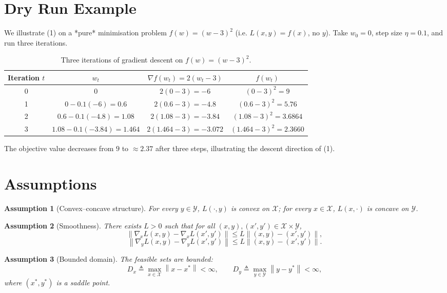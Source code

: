 \documentclass{article}
\newcommand{\norm}[1]{\left\|#1\right\|}
\newtheorem{assumption}{Assumption}
\begin{document}
\section*{Dry Run Example}
We illustrate (1) on a *pure* minimisation problem $f(w)=(w-3)^2$ (i.e. $L(x,y)=f(x)$, no $y$).  
Take $w_0=0$, step size $\eta=0.1$, and run three iterations.

\begin{table}[h]
\centering
\begin{tabular}{c c c c}
\toprule
Iteration $t$ & $w_t$ & $\nabla f(w_t)=2(w_t-3)$ & $f(w_t)$\\
\midrule
0 & $0$ & $2(0-3)=-6$ & $(0-3)^2=9$\\
1 & $0-0.1(-6)=0.6$ & $2(0.6-3)=-4.8$ & $(0.6-3)^2=5.76$\\
2 & $0.6-0.1(-4.8)=1.08$ & $2(1.08-3)=-3.84$ & $(1.08-3)^2=3.6864$\\
3 & $1.08-0.1(-3.84)=1.464$ & $2(1.464-3)=-3.072$ & $(1.464-3)^2=2.3660$\\
\bottomrule
\end{tabular}
\caption{Three iterations of gradient descent on $f(w)=(w-3)^2$.}
\end{table}

The objective value decreases from $9$ to $\approx2.37$ after three steps, illustrating the descent direction of (1).

\newpage
\section*{Assumptions}
\begin{assumption}[Convex–concave structure]\label{ass:convconc}
For every $y\in\mathcal{Y}$, $L(\cdot ,y)$ is convex on $\mathcal{X}$;  
for every $x\in\mathcal{X}$, $L(x,\cdot )$ is concave on $\mathcal{Y}$.
\end{assumption}

\begin{assumption}[Smoothness]\label{ass:smooth}
There exists $L>0$ such that for all $(x,y),(x',y')\in\mathcal{X}\times\mathcal{Y}$,
\[
\norm{\nabla_x L(x,y)-\nabla_x L(x',y')}\le L\norm{(x,y)-(x',y')},
\]
\[
\norm{\nabla_y L(x,y)-\nabla_y L(x',y')}\le L\norm{(x,y)-(x',y')}.
\]
\end{assumption}

\begin{assumption}[Bounded domain]\label{ass:bounded}
The feasible sets are bounded:
\[
D_x \triangleq \max_{x\in\mathcal{X}}\norm{x-x^*}<\infty,\qquad
D_y \triangleq \max_{y\in\mathcal{Y}}\norm{y-y^*}<\infty,
\]
where $(x^*,y^*)$ is a saddle point.
\end{assumption}
\end{document}
